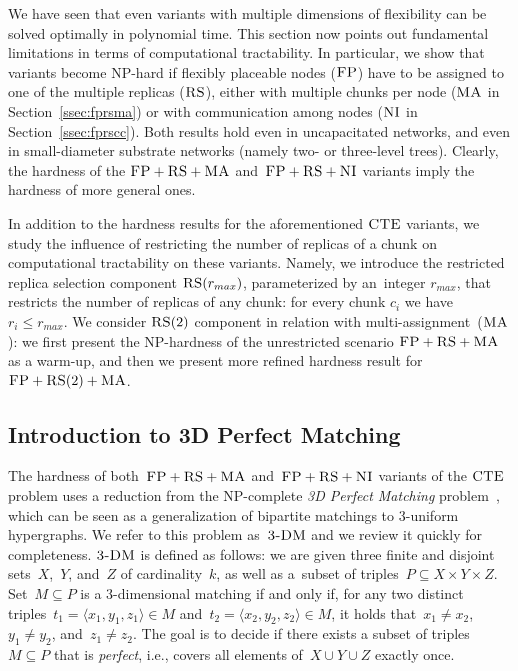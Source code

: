 We have seen that even variants with multiple dimensions of
flexibility can be solved optimally in polynomial time.
This section now points out fundamental
limitations in terms of computational tractability.
In particular, we
show that variants become NP-hard if flexibly placeable nodes ($\textsc{FP}$) have to be assigned to one of the multiple replicas ($\textsc{RS}$), either with multiple chunks per node ($\textsc{MA}$ in Section~\ref{ssec:fprsma}) or with communication among nodes ($\textsc{NI}$ in Section~\ref{ssec:fprscc}).
Both results hold even in uncapacitated networks, and even in small-diameter
substrate networks (namely two- or three-level trees).
Clearly, the hardness of the $\textsc{FP}+\textsc{RS}+\textsc{MA}$ and~$\textsc{FP}+\textsc{RS}+\textsc{NI}$ variants imply
the hardness of more general ones.

In addition to the hardness results for the aforementioned $\textsc{CTE}$ variants, we study the influence of restricting the number of replicas of a chunk on computational tractability on these variants.
Namely, we introduce the restricted replica selection component $\textsc{RS}(r_{max})$, parameterized by an~integer $r_{max}$, that restricts the number of replicas of any chunk: for every chunk $c_i$ we have $r_i \leq r_{max}$.
We consider $\textsc{RS}(2)$ component in relation with multi-assignment~($\textsc{MA}$): we first present the NP-hardness of the unrestricted scenario $\textsc{FP}+\textsc{RS}+\textsc{MA}$ as a warm-up,
and then we present more refined hardness result for ${\textsc{FP}+\textsc{RS}(2)+\textsc{MA}}$.

\subsection{Introduction to 3D Perfect Matching}
\label{sec:3dm_intro}

The hardness of both~$\textsc{FP}+\textsc{RS}+\textsc{MA}$ and~$\textsc{FP}+\textsc{RS}+\textsc{NI}$ variants of the $\textsc{CTE}$ problem uses a reduction
from the NP-complete \emph{3D Perfect Matching} problem~\cite{3dmatch},
which can be seen as a generalization of bipartite matchings to 3-uniform
hypergraphs. We refer to this problem as~$\textsc{3-DM}$ and we
review it quickly for completeness.
$\textsc{3-DM}$ is defined as follows: we are given three finite and disjoint
sets~$X$,~$Y$, and~$Z$ of cardinality~$k$, as well as a~subset of triples~$P\subseteq
X \times Y \times Z$.  Set~$M \subseteq P$ is a 3-dimensional matching
if and only if, for any two distinct triples~$t_1=\langle x_1, y_1, z_1\rangle \in M$
and~$t_2= \langle x_2, y_2, z_2 \rangle \in M$, it holds that~$x_1\neq x_2$,~$y_1\neq
y_2$, and~$z_1\neq z_2$. The goal is to decide if there exists
a subset of triples $M \subseteq P$ that is \emph{perfect}, i.e., covers all
elements of~$X \cup Y \cup Z$ exactly once.


